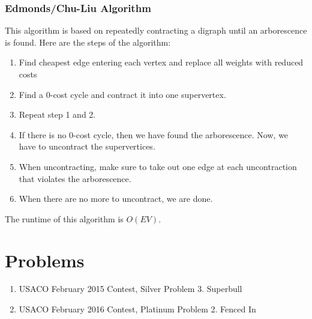 \documentclass[11pt]{article}
\begin{document}
\subsubsection{Edmonds/Chu-Liu Algorithm}

This algorithm is based on repeatedly contracting a digraph until an arborescence is found. Here are the steps of the algorithm:

\begin{enumerate}
    \item Find cheapest edge entering each vertex and replace all weights with reduced costs
    \item Find a 0-cost cycle and contract it into one supervertex.
    \item Repeat step 1 and 2.
    \item If there is no 0-cost cycle, then we have found the arborescence. Now, we have to uncontract the supervertices.
    \item When uncontracting, make sure to take out one edge at each uncontraction that violates the arborescence.
    \item When there are no more to uncontract, we are done.
\end{enumerate}

The runtime of this algorithm is $O(EV)$.
\section{Problems}

\begin{enumerate}
    \item USACO February 2015 Contest, Silver Problem 3. Superbull
    \item USACO February 2016 Contest, Platinum Problem 2. Fenced In
\end{enumerate}
\end{document}
